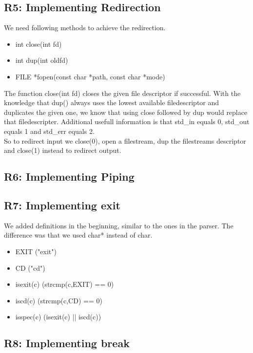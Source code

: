 \subsection{R5: Implementing Redirection}
We need following methods to achieve the redirection.
\begin{itemize}
\item int close(int fd)
\item int dup(int oldfd)
\item FILE *fopen(const char *path, const char *mode)
\end{itemize}
The function close(int fd) closes the given file descriptor if successful. With the knowledge that dup() always uses the lowest available filedescriptor and duplicates the given one, we know that using close followed by dup would replace that filedescripter.
Additional usefull information is that std\_in equals 0, std\_out equals 1 and std\_err equals 2.\\
So to  redirect input we close(0), open a filestream, dup the filestreams descriptor and close(1) instead to redirect output.

\subsection{R6: Implementing Piping}

\subsection{R7: Implementing exit}
We added definitions in the beginning, similar to the ones in the parser. The difference was that we used char* instead of char.
\begin{itemize}
\item EXIT	("exit")
\item CD      ("cd")
\item isexit(c) (strcmp(c,EXIT) == 0)
\item iscd(c) (strcmp(c,CD) == 0)
\item isspec(c) (isexit(c) || iscd(c))
\end{itemize}


\subsection{R8: Implementing break}

